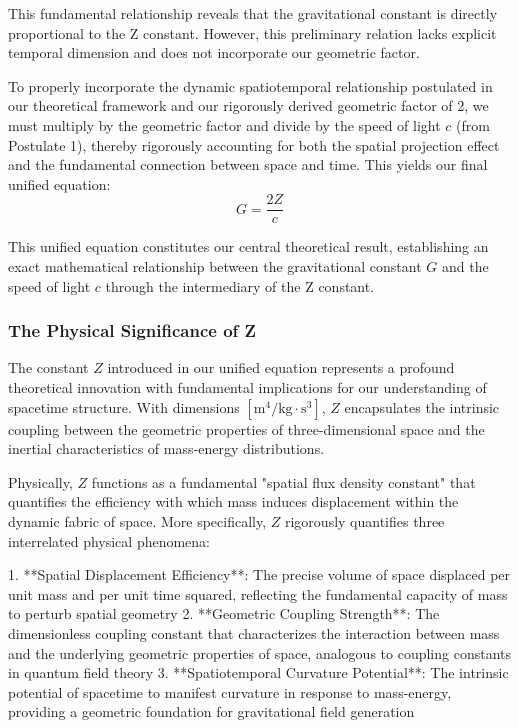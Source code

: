 \documentclass[12pt]{article}
\numberwithin{equation}{section}
\begin{document}
This fundamental relationship reveals that the gravitational constant is directly proportional to the Z constant. However, this preliminary relation lacks explicit temporal dimension and does not incorporate our geometric factor.

To properly incorporate the dynamic spatiotemporal relationship postulated in our theoretical framework and our rigorously derived geometric factor of 2, we must multiply by the geometric factor and divide by the speed of light $c$ (from Postulate 1), thereby rigorously accounting for both the spatial projection effect and the fundamental connection between space and time. This yields our final unified equation:
\begin{equation}
G = \frac{2Z}{c}
\label{eq:unified_equation}
\end{equation}

This unified equation constitutes our central theoretical result, establishing an exact mathematical relationship between the gravitational constant $G$ and the speed of light $c$ through the intermediary of the Z constant.

\subsubsection{The Physical Significance of Z}

The constant $Z$ introduced in our unified equation represents a profound theoretical innovation with fundamental implications for our understanding of spacetime structure. With dimensions $[\text{m}^4/\text{kg} \cdot \text{s}^3]$, $Z$ encapsulates the intrinsic coupling between the geometric properties of three-dimensional space and the inertial characteristics of mass-energy distributions.

Physically, $Z$ functions as a fundamental "spatial flux density constant" that quantifies the efficiency with which mass induces displacement within the dynamic fabric of space. More specifically, $Z$ rigorously quantifies three interrelated physical phenomena:

1. **Spatial Displacement Efficiency**: The precise volume of space displaced per unit mass and per unit time squared, reflecting the fundamental capacity of mass to perturb spatial geometry
2. **Geometric Coupling Strength**: The dimensionless coupling constant that characterizes the interaction between mass and the underlying geometric properties of space, analogous to coupling constants in quantum field theory
3. **Spatiotemporal Curvature Potential**: The intrinsic potential of spacetime to manifest curvature in response to mass-energy, providing a geometric foundation for gravitational field generation
\end{document}
